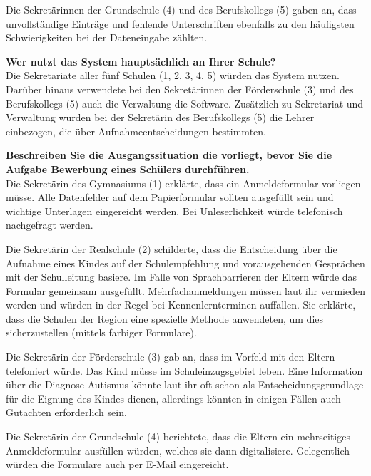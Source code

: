Die Sekretärinnen der Grundschule (4) und des Berufskollegs (5) gaben an, dass unvollständige Einträge und fehlende Unterschriften ebenfalls zu den häufigsten Schwierigkeiten bei der Dateneingabe zählten.


\textbf{Wer nutzt das System hauptsächlich an Ihrer Schule?}\\
Die Sekretariate aller fünf Schulen (1, 2, 3, 4, 5) würden das System nutzen. Darüber hinaus verwendete bei den Sekretärinnen der Förderschule (3) und des Berufskollegs (5) auch die Verwaltung die Software. Zusätzlich zu Sekretariat und Verwaltung wurden bei der Sekretärin des Berufskollegs (5) die Lehrer einbezogen, die über Aufnahmeentscheidungen bestimmten. 


\textbf{Beschreiben Sie die Ausgangssituation die vorliegt, bevor Sie die Aufgabe \glqq Bewerbung eines Schülers\grqq{} durchführen.}\\
Die Sekretärin des Gymnasiums (1) erklärte, dass ein Anmeldeformular vorliegen müsse. Alle Datenfelder auf dem Papierformular sollten ausgefüllt sein und wichtige Unterlagen eingereicht werden. Bei Unleserlichkeit würde telefonisch nachgefragt werden.

Die Sekretärin der Realschule (2) schilderte, dass die Entscheidung über die Aufnahme eines Kindes auf der Schulempfehlung und vorausgehenden Gesprächen mit der Schulleitung basiere. Im Falle von Sprachbarrieren der Eltern würde das Formular gemeinsam ausgefüllt. Mehrfachanmeldungen müssen laut ihr vermieden werden und würden in der Regel bei Kennenlernterminen auffallen. Sie erklärte, dass die Schulen der Region eine spezielle Methode anwendeten, um dies sicherzustellen (mittels farbiger Formulare).

Die Sekretärin der Förderschule (3) gab an, dass im Vorfeld mit den Eltern telefoniert würde. Das Kind müsse im Schuleinzugsgebiet leben. Eine Information über die Diagnose Autismus könnte laut ihr oft schon als Entscheidungsgrundlage für die Eignung des Kindes dienen, allerdings könnten in einigen Fällen auch Gutachten erforderlich sein.

Die Sekretärin der Grundschule (4) berichtete, dass die Eltern ein mehrseitiges Anmeldeformular ausfüllen würden, welches sie dann digitalisiere. Gelegentlich würden die Formulare auch per E-Mail eingereicht.

